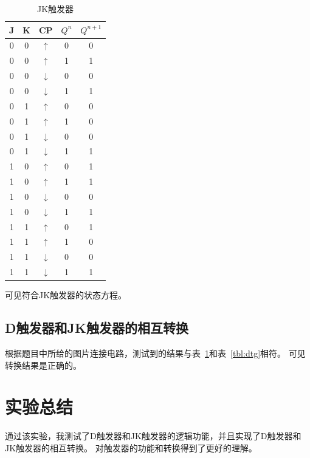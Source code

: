 \documentclass[a4paper,twoside]{ctexart}
\begin{document}
\begin{spacing}{1.2}
\begin{table}[H]
	\centering
	\caption{JK触发器}
	\label{tbl:jk}
	\begin{tabular}{cc|c|cc}
		\toprule
		\hline
		J & K & CP & $Q^n$& $Q^{n+1}$ \\
		\hline
		0 & 0 & $\uparrow$ & 0 & 0 \\
		0 & 0 & $\uparrow$ & 1 & 1 \\
		0 & 0 & $\downarrow$ & 0 & 0 \\
		0 & 0 & $\downarrow$ & 1 & 1 \\
		\hline
		0 & 1 & $\uparrow$ & 0 & 0 \\
		0 & 1 & $\uparrow$ & 1 & 0 \\
		0 & 1 & $\downarrow$ & 0 & 0 \\
		0 & 1 & $\downarrow$ & 1 & 1 \\
		\hline
		1 & 0 & $\uparrow$ & 0 & 1 \\
		1 & 0 & $\uparrow$ & 1 & 1 \\
		1 & 0 & $\downarrow$ & 0 & 0 \\
		1 & 0 & $\downarrow$ & 1 & 1 \\
		\hline
		1 & 1 & $\uparrow$ & 0 & 1 \\
		1 & 1 & $\uparrow$ & 1 & 0 \\
		1 & 1 & $\downarrow$ & 0 & 0 \\
		1 & 1 & $\downarrow$ & 1 & 1 \\
		\hline
		\bottomrule
	\end{tabular}
\end{table}

可见符合JK触发器的状态方程。

\subsection{D触发器和JK触发器的相互转换}

根据题目中所给的图片连接电路，测试到的结果与表~\ref{tbl:jk}和表~\ref{tbl:dtg}相符。
可见转换结果是正确的。

\section{实验总结}

通过该实验，我测试了D触发器和JK触发器的逻辑功能，并且实现了D触发器和JK触发器的相互转换。
对触发器的功能和转换得到了更好的理解。

\clearpage


\setcounter{section}{4}


\end{spacing}
\end{document}
